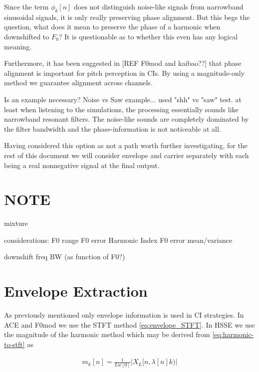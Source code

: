 \documentclass [11pt, proquest] {uwthesis}[2015/03/03]
\begin{document}
Since the term $\phi_k[n]$ does not distinguish noise-like signals from narrowband sinusoidal signals, it is only really preserving phase alignment.  But this begs the question, what does it mean to preserve the phase of a harmonic when downshifted to $F_0$?  It is questionable as to whether this even has any logical meaning.


Furthermore, it has been suggested in [REF F0mod and kaibao??] that phase alignment is important for pitch perception in CIs.  By using a magnitude-only method we guarantee alignment across channels.

Is an example necessary? Noise vs Saw example...
used "shh" vs "saw" test.  at least when listening to the simulations, the processing essentially sounds like narrowband resonant filters.  The noise-like sounds are completely dominated by the filter bandwidth and the phase-information is not noticeable at all.

Having considered this option as not a path worth further investigating, for the rest of this document we will consider envelope and carrier separately with each being a real nonnegative signal at the final output.

\section{NOTE}

mixture %

considerations:
F0 range
F0 error
Harmonic Index
F0 error mean/variance

downshift freq
BW (as function of F0?)


\section{Envelope Extraction}

As previously mentioned only envelope information is used in CI strategies.  In ACE and F0mod we use the STFT method \ref{eq:envelope_STFT}.  In HSSE we use the magnitude of the harmonic method which may be derived from \ref{eq:harmonic-to-stft} as 

\begin{align}
\label{eq:envelope_general}
m_k[n] = \frac{1}{Lw[0]} \vert X_L[n, \lambda[n]k) \vert
\end{align}
\end{document}
